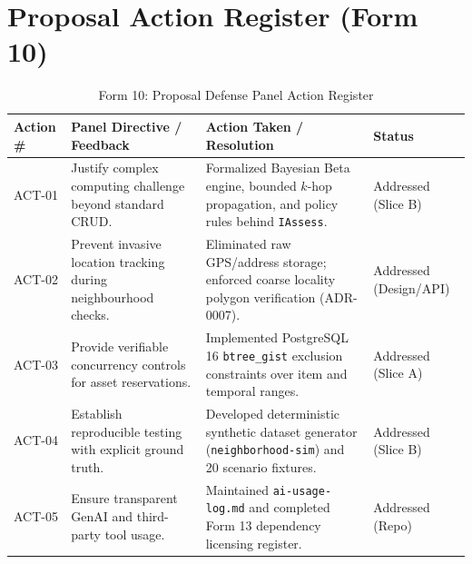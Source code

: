 \chapter{Proposal Action Register (Form 10)}
\label{app:action_register}

\begin{table}[htbp]
\centering
\caption{Form 10: Proposal Defense Panel Action Register}
\label{tab:panel_actions}
\small
\begin{tabularx}{\textwidth}{l p{4.5cm} p{5.5cm} l}
\toprule
\textbf{Action \#} & \textbf{Panel Directive / Feedback} & \textbf{Action Taken / Resolution} & \textbf{Status} \\
\midrule
ACT-01 & Justify complex computing challenge beyond standard CRUD. & Formalized Bayesian Beta engine, bounded $k$-hop propagation, and policy rules behind \texttt{IAssess}. & Addressed (Slice B) \\
ACT-02 & Prevent invasive location tracking during neighbourhood checks. & Eliminated raw GPS/address storage; enforced coarse locality polygon verification (ADR-0007). & Addressed (Design/API) \\
ACT-03 & Provide verifiable concurrency controls for asset reservations. & Implemented PostgreSQL 16 \texttt{btree\_gist} exclusion constraints over item and temporal ranges. & Addressed (Slice A) \\
ACT-04 & Establish reproducible testing with explicit ground truth. & Developed deterministic synthetic dataset generator (\texttt{neighborhood-sim}) and 20 scenario fixtures. & Addressed (Slice B) \\
ACT-05 & Ensure transparent GenAI and third-party tool usage. & Maintained \texttt{ai-usage-log.md} and completed Form 13 dependency licensing register. & Addressed (Repo) \\
\bottomrule
\end{tabularx}
\end{table}
